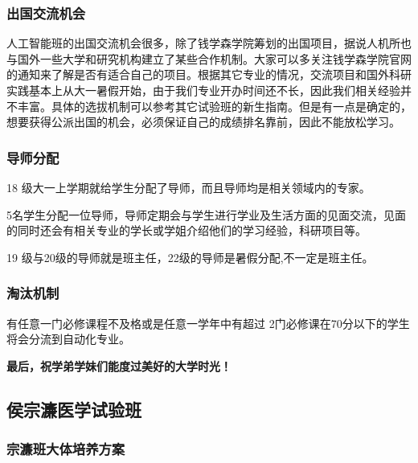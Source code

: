 \documentclass[
decoration,  %
]{qyxf-book}
\begin{document}
\hypertarget{ux51faux56fdux4ea4ux6d41ux673aux4f1a}{%
	\subsubsection{出国交流机会}\label{ux51faux56fdux4ea4ux6d41ux673aux4f1a}}

人工智能班的出国交流机会很多，除了钱学森学院筹划的出国项目，据说人机所也与国外一些大学和研究机构建立了某些合作机制。大家可以多关注钱学森学院官网的通知来了解是否有适合自己的项目。根据其它专业的情况，交流项目和国外科研实践基本上从大一暑假开始，由于我们专业开办时间还不长，因此我们相关经验并不丰富。具体的选拔机制可以参考其它试验班的新生指南。但是有一点是确定的，想要获得公派出国的机会，必须保证自己的成绩排名靠前，因此不能放松学习。

\hypertarget{ux5bfcux5e08ux5206ux914d}{%
	\subsubsection{导师分配}\label{ux5bfcux5e08ux5206ux914d}}

18 级大一上学期就给学生分配了导师，而且导师均是相关领域内的专家。

5名学生分配一位导师，导师定期会与学生进行学业及生活方面的见面交流，见面的同时还会有相关专业的学长或学姐介绍他们的学习经验，科研项目等。

19 级与20级的导师就是班主任，22级的导师是暑假分配,不一定是班主任。


\hypertarget{ux6dd8ux6c70ux673aux5236}{%
	\subsubsection{淘汰机制}\label{ux6dd8ux6c70ux673aux5236}}

有任意一门必修课程不及格或是任意一学年中有超过 2门必修课在70分以下的学生将会分流到自动化专业。

\textbf{最后，祝学弟学妹们能度过美好的大学时光！}

\hypertarget{ux4fafux5b97ux6fc2ux533bux5b66ux8bd5ux9a8cux73ed}{%
	\subsection{侯宗濂医学试验班}\label{ux4fafux5b97ux6fc2ux533bux5b66ux8bd5ux9a8cux73ed}}

\hypertarget{ux5b97ux6fc2ux73edux5927ux4f53ux57f9ux517bux65b9ux6848}{%
	\subsubsection{宗濂班大体培养方案}\label{ux5b97ux6fc2ux73edux5927ux4f53ux57f9ux517bux65b9ux6848}}
\end{document}
